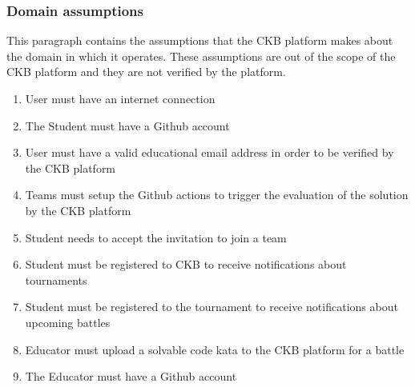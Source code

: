 \subsubsection{Domain assumptions}
This paragraph contains the assumptions that the CKB platform makes about the domain in which it operates. These assumptions are out of the scope of the CKB platform and they are not verified by the platform.

\begin{enumerate}[label=D\arabic*:]
    \item User must have an internet connection
    \item The Student must have a Github account
    \item User must have a valid educational email address in order to be verified by the CKB platform
    \item Teams must setup the Github actions to trigger the evaluation of the solution by the CKB platform
    \item Student needs to accept the invitation to join a team
    \item Student must be registered to CKB to receive notifications about tournaments
    \item Student must be registered to the tournament to receive notifications about upcoming battles
    \item Educator must upload a solvable code kata to the CKB platform for a battle
    \item The Educator must have a Github account
\end{enumerate}